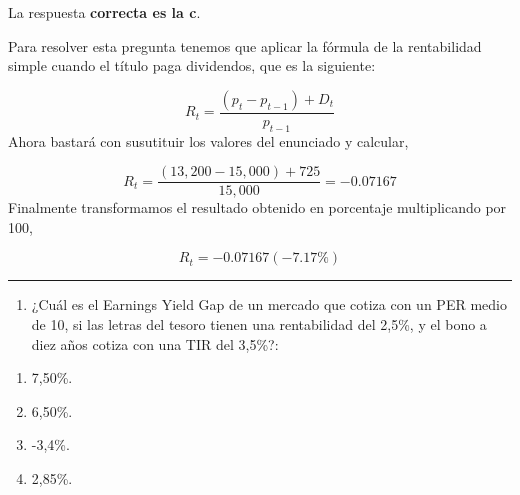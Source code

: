 \documentclass[
  letterpaper,
  DIV=11,
  numbers=noendperiod]{scrreprt}
\providecommand{\tightlist}{%
  \setlength{\itemsep}{0pt}\setlength{\parskip}{0pt}}\usepackage{longtable,booktabs,array}
\begin{document}
\begin{tcolorbox}[enhanced jigsaw, left=2mm, opacityback=0, colback=white, breakable, arc=.35mm, bottomrule=.15mm, rightrule=.15mm, toprule=.15mm, leftrule=.75mm, colframe=quarto-callout-tip-color-frame]
\begin{minipage}[t]{5.5mm}
\textcolor{quarto-callout-tip-color}{\faLightbulb}
\end{minipage}%
\begin{minipage}[t]{\textwidth - 5.5mm}

La respuesta \textbf{correcta es la c}.

Para resolver esta pregunta tenemos que aplicar la fórmula de la
rentabilidad simple cuando el título paga dividendos, que es la
siguiente:

\[R_t=\dfrac{(p _{t}-p _{t-1})+D_t}{p_{t-1}}\] Ahora bastará con
susutituir los valores del enunciado y calcular,

\[R_t=\dfrac{(13,200-15,000)+725}{15,000}= -0.07167\] Finalmente
transformamos el resultado obtenido en porcentaje multiplicando por 100,

\[R_t= -0.07167(-7.17\%)\]

\end{minipage}%
\end{tcolorbox}

\begin{center}\rule{0.5\linewidth}{0.5pt}\end{center}

\begin{enumerate}
\def\labelenumi{\arabic{enumi}.}
\setcounter{enumi}{85}
\tightlist
\item
  ¿Cuál es el Earnings Yield Gap de un mercado que cotiza con un PER
  medio de 10, si las letras del tesoro tienen una rentabilidad del
  2,5\%, y el bono a diez años cotiza con una TIR del 3,5\%?:
\end{enumerate}

\begin{enumerate}
\def\labelenumi{\alph{enumi})}
\item
  7,50\%.
\item
  6,50\%.
\item
  -3,4\%.
\item
  2,85\%.
\end{enumerate}
\end{document}
